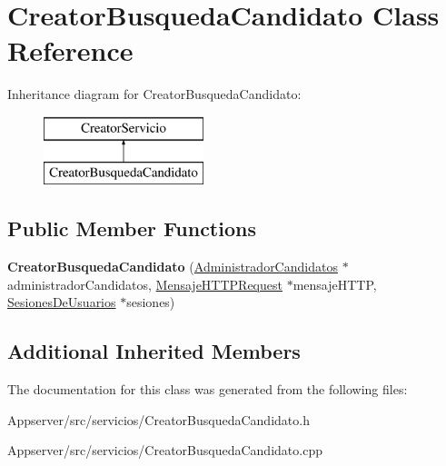 \hypertarget{classCreatorBusquedaCandidato}{}\section{Creator\+Busqueda\+Candidato Class Reference}
\label{classCreatorBusquedaCandidato}
Inheritance diagram for Creator\+Busqueda\+Candidato\+:\begin{figure}[H]
\begin{center}
\leavevmode
\includegraphics[height=2.000000cm]{classCreatorBusquedaCandidato}
\end{center}
\end{figure}
\subsection*{Public Member Functions}
\begin{DoxyCompactItemize}
\item 
{\bfseries Creator\+Busqueda\+Candidato} (\hyperlink{classAdministradorCandidatos}{Administrador\+Candidatos} $\ast$administrador\+Candidatos, \hyperlink{classMensajeHTTPRequest}{Mensaje\+H\+T\+T\+P\+Request} $\ast$mensaje\+H\+T\+TP, \hyperlink{classSesionesDeUsuarios}{Sesiones\+De\+Usuarios} $\ast$sesiones)\hypertarget{classCreatorBusquedaCandidato_a1543ea23204ada71e210f018722ea18a}{}\label{classCreatorBusquedaCandidato_a1543ea23204ada71e210f018722ea18a}

\end{DoxyCompactItemize}
\subsection*{Additional Inherited Members}


The documentation for this class was generated from the following files\+:\begin{DoxyCompactItemize}
\item 
Appserver/src/servicios/Creator\+Busqueda\+Candidato.\+h\item 
Appserver/src/servicios/Creator\+Busqueda\+Candidato.\+cpp\end{DoxyCompactItemize}
